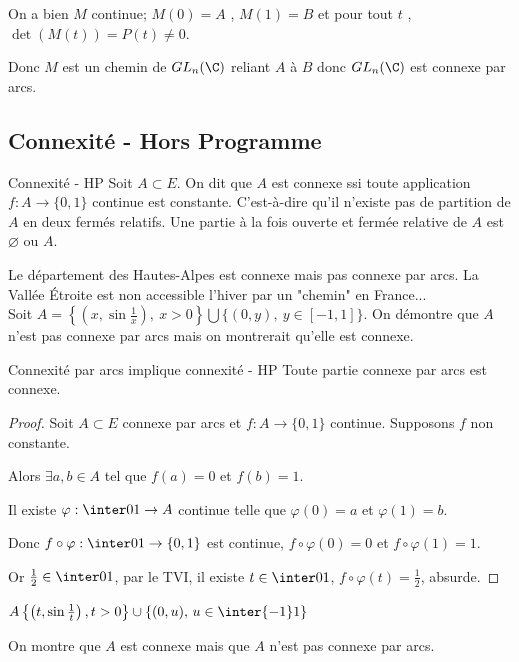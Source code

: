 On a bien $M$ continue; $M(0)=A$ , $M(1)=B$ et pour tout $t$ , $\det(M(t))=P(t) \neq 0$.

Donc $M$ est un chemin de $GL_n(\C)$ reliant $A$ à $B$ donc $GL_n(\C)$ est connexe par arcs.

\subsection{Connexité - Hors Programme}

\begin{definition}{Connexité - HP}{}
    Soit $A \subset E$. 
    On dit que $A$ est connexe ssi toute application $f : A \to \{0, 1\}$ continue est constante. 
    C'est-à-dire qu'il n'existe pas de partition de $A$ en deux fermés relatifs.
    Une partie à la fois ouverte et fermée relative de $A$ est $\varnothing$ ou $A$.
\end{definition}

\begin{exemple}
    Le département des Hautes-Alpes est connexe mais pas connexe par arcs.
    La Vallée Étroite est non accessible l'hiver par un "chemin" en France... \\

    Soit $A = \left\{\left(x, \sin{\frac 1 x}\right),~x > 0\right\} \bigcup \{(0,y),~y\in [-1,1]\}$. On démontre que $A$ n'est pas connexe par arcs mais on montrerait qu'elle est connexe. 
\end{exemple}

\begin{proposition}{Connexité par arcs implique connexité - HP}{}
    Toute partie connexe par arcs est connexe. 
\end{proposition}


\begin{proof}
    Soit $A \subset E$ connexe par arcs et $f : A \to \{0, 1\}$ continue. Supposons $f$ non constante. 

    Alors $\exists a, b \in A$ tel que $f(a) = 0$ et $f(b) = 1$.

    Il existe $\varphi : \inter 0 1 \to A$ continue telle que $\varphi(0) = a$ et $\varphi(1) = b$.

    Donc $f \circ \varphi : \inter 0 1 \to \{0, 1\}$ est continue, $f \circ \varphi(0) = 0$ et $f \circ \varphi (1) = 1$. 

    Or $\frac 1 2 \in \inter 0 1$, par le TVI, il existe $t \in \inter 0 1$, $f \circ \varphi (t) = \frac 1 2$, absurde. 
\end{proof}

\begin{exemple}
    $A \left\{\left(t, \sin \frac 1 t\right), t > 0\right\} \cup \{(0, u), \, u \in \inter {-1} 1\}$

    On montre que $A$ est connexe mais que $A$ n'est pas connexe par arcs.
\end{exemple}
